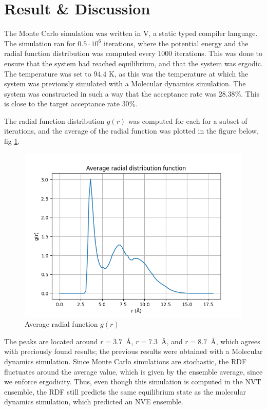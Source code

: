 \documentclass[a4paper]{article}
\newcommand{\newparagraph}{\vspace{.5cm}\noindent}
\begin{document}
\section*{Result \& Discussion}
The Monte Carlo simulation was written in V, a static typed compiler language. The simulation ran for $0.5\cdot10^6$ iterations, where the potential energy and the radial function distribution was computed every $1000$ iterations.
This was done to ensure that the system had reached equilibrium, and that the system was ergodic. The temperature was set to $94.4$ K, as this was the temperature at which the system was previously simulated with a Molecular dynamics simulation.
The system was constructed in such a way that the acceptance rate was $28.38$\%. This is close to the target acceptance rate $30$\%.

\newparagraph
The radial function distribution $g(r)$ was computed for each for a subset of iterations, and the average of the radial function was plotted in the figure below, fig \ref{fig: radial function}.
\begin{figure}[H]
    \centering
    \includegraphics[scale = 0.5]{average_radial.png}
    \caption{Average radial function $g(r)$}
    \label{fig: radial function}
\end{figure}\noindent
The peaks are located around $r = 3.7$~Å, $r=7.3$~Å, and $r = 8.7$~Å, which agrees with preciously found results; the previous results were obtained with a Molecular dynamics simulation.
Since Monte Carlo simulations are stochastic, the RDF fluctuates around the average value, which is given by the ensemble average, since we enforce ergodicity. 
Thus, even though this simulation is computed in the NVT ensemble, the RDF still predicts the same equilibrium state as the molecular dynamics simulation, which predicted an NVE ensemble.
\end{document}
